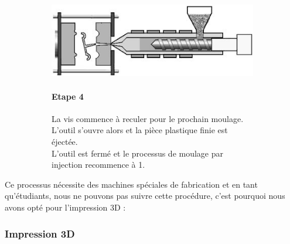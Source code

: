 \begin{figure}[!htbp]
    \centering
    \begin{subfigure}[m]{.55\linewidth}
        \centering
        \includegraphics[width=\textwidth]{assets/conception1/img113.jpg}
    \end{subfigure}
    \hfill
    \begin{subfigure}[m]{.4\linewidth}
       \paragraph*{Etape 4}
        La vis commence à reculer pour le prochain moulage. L’outil s’ouvre alors et la pièce plastique finie est éjectée. \\
        L’outil est fermé et le processus de moulage par injection recommence à 1.
    \end{subfigure}
\end{figure}

\FloatBarrier

Ce processus nécessite des machines spéciales de fabrication et en tant qu’étudiants, nous ne pouvons pas suivre cette procédure, c’est pourquoi nous avons opté pour l’impression 3D :

\subsubsection{Impression 3D}

